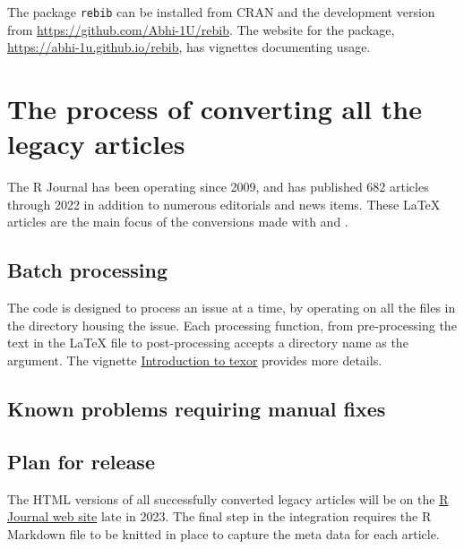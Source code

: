 The package \texttt{rebib} can be installed from CRAN and the development version from \url{https://github.com/Abhi-1U/rebib}. The website for the package, \url{https://abhi-1u.github.io/rebib}, has vignettes documenting usage.

\hypertarget{the-process-of-converting-all-the-legacy-articles}{%
\section{The process of converting all the legacy articles}\label{the-process-of-converting-all-the-legacy-articles}}

The R Journal has been operating since 2009, and has published 682 articles through 2022 in addition to numerous editorials and news items. These LaTeX articles are the main focus of the conversions made with  and .

\hypertarget{batch-processing}{%
\subsection{Batch processing}\label{batch-processing}}

The code is designed to process an issue at a time, by operating on all the files in the directory housing the issue. Each processing function, from pre-processing the text in the LaTeX file to post-processing accepts a directory name as the argument. The vignette \href{https://abhi-1u.github.io/texor/articles/introduction-to-texor.html}{Introduction to texor} provides more details.

\hypertarget{known-problems-requiring-manual-fixes}{%
\subsection{Known problems requiring manual fixes}\label{known-problems-requiring-manual-fixes}}

\hypertarget{plan-for-release}{%
\subsection{Plan for release}\label{plan-for-release}}

The HTML versions of all successfully converted legacy articles will be on the \href{https://journal.r-project.org}{R Journal web site} late in 2023. The final step in the integration requires the R Markdown file to be knitted in place to capture the meta data for each article.


